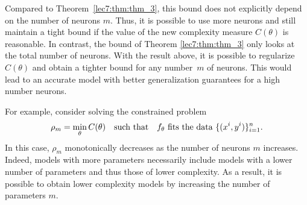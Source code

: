 \begin{remark}
Compared to Theorem~\ref{lec7:thm:thm_3}, this bound does not explicitly depend on the number of neurons $m$. Thus, it is possible to use more neurons and still maintain a tight bound if the value of the new complexity measure $C(\theta)$ is reasonable. In contrast, the bound of Theorem \ref{lec7:thm:thm_3} only looks at the total number of neurons. With the result above, it is possible to regularize $C(\theta)$ and obtain a tighter bound for any number~$m$ of neurons. This would lead to an accurate model with better generalization guarantees for a high number neurons. 

For example, consider solving the constrained problem
\begin{equation}
    \rho_m = \min_\theta C(\theta) 
    \quad \text{such that}\quad 
    \text{$f_\theta$ fits the data  $\{(x\sp{i}, y\sp{i})\}_{i=1}^n$.}
\end{equation}
In this case, $\rho_m$ monotonically decreases as the number of neurons $m$ increases. Indeed, models with more parameters necessarily include models with a lower number of parameters and thus those of lower complexity.  As a result, it is possible to obtain lower complexity models by increasing the number of parameters $m$.
\end{remark}
